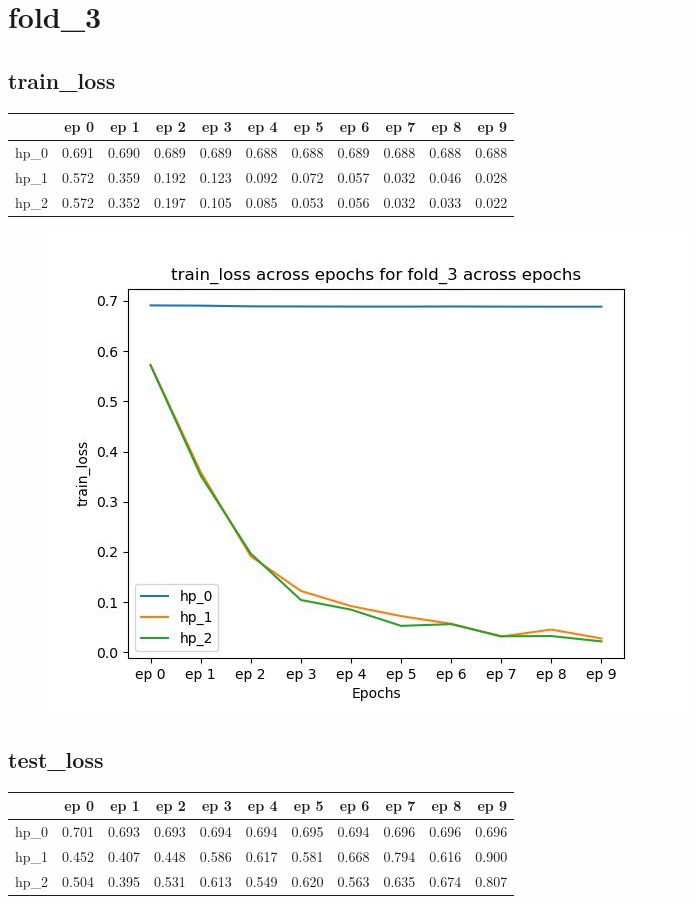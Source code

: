 \documentclass{article}
\begin{document}
\section{fold\_3}
\subsection{train\_loss}
\begin{tabular}{lrrrrrrrrrr}
\toprule
{} &   ep 0 &   ep 1 &   ep 2 &   ep 3 &   ep 4 &   ep 5 &   ep 6 &   ep 7 &   ep 8 &   ep 9 \\
\midrule
hp\_0 &  0.691 &  0.690 &  0.689 &  0.689 &  0.688 &  0.688 &  0.689 &  0.688 &  0.688 &  0.688 \\
hp\_1 &  0.572 &  0.359 &  0.192 &  0.123 &  0.092 &  0.072 &  0.057 &  0.032 &  0.046 &  0.028 \\
hp\_2 &  0.572 &  0.352 &  0.197 &  0.105 &  0.085 &  0.053 &  0.056 &  0.032 &  0.033 &  0.022 \\
\bottomrule
\end{tabular}

\begin{figure}[H]
\includegraphics[scale = 0.75]{fold_3/train_loss}
\end{figure}
\subsection{test\_loss}
\begin{tabular}{lrrrrrrrrrr}
\toprule
{} &   ep 0 &   ep 1 &   ep 2 &   ep 3 &   ep 4 &   ep 5 &   ep 6 &   ep 7 &   ep 8 &   ep 9 \\
\midrule
hp\_0 &  0.701 &  0.693 &  0.693 &  0.694 &  0.694 &  0.695 &  0.694 &  0.696 &  0.696 &  0.696 \\
hp\_1 &  0.452 &  0.407 &  0.448 &  0.586 &  0.617 &  0.581 &  0.668 &  0.794 &  0.616 &  0.900 \\
hp\_2 &  0.504 &  0.395 &  0.531 &  0.613 &  0.549 &  0.620 &  0.563 &  0.635 &  0.674 &  0.807 \\
\bottomrule
\end{tabular}
\end{document}

